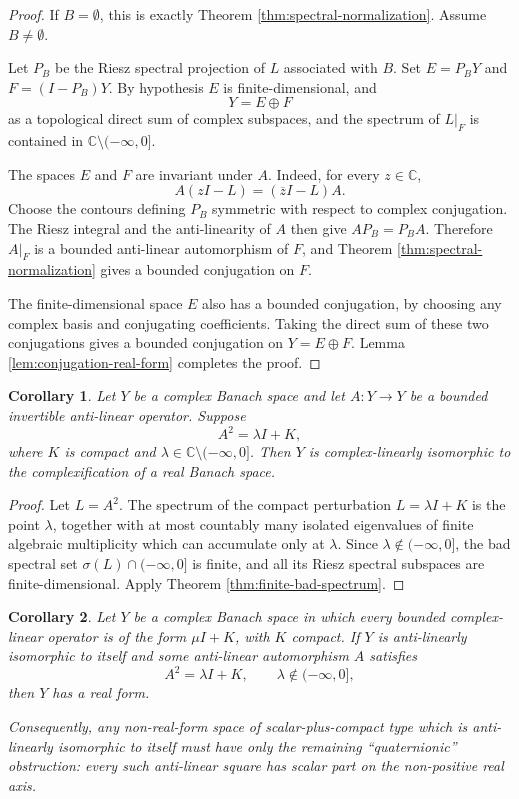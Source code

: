 \documentclass[11pt]{article}
\newtheorem{corollary}{Corollary}
\theoremstyle{remark}
\newcommand{\C}{\mathbb C}
\begin{document}
\begin{proof}
If \(B=\emptyset\), this is exactly Theorem
\ref{thm:spectral-normalization}.  Assume \(B\ne\emptyset\).

Let \(P_B\) be the Riesz spectral projection of \(L\) associated with \(B\).
Set \(E=P_BY\) and \(F=(I-P_B)Y\).  By hypothesis \(E\) is finite-dimensional,
and
\[
  Y=E\oplus F
\]
as a topological direct sum of complex subspaces, and the spectrum of \(L|_F\)
is contained in \(\C\setminus(-\infty,0]\).

The spaces \(E\) and \(F\) are invariant under \(A\).  Indeed, for every
\(z\in\C\),
\[
  A(zI-L)=(\overline z I-L)A .
\]
Choose the contours defining \(P_B\) symmetric with respect to complex
conjugation.  The Riesz integral and the anti-linearity of \(A\) then give
\(AP_B=P_BA\).  Therefore \(A|_F\) is a bounded anti-linear automorphism of
\(F\), and Theorem
\ref{thm:spectral-normalization} gives a bounded conjugation on \(F\).

The finite-dimensional space \(E\) also has a bounded conjugation, by choosing
any complex basis and conjugating coefficients.  Taking the direct sum of these
two conjugations gives a bounded conjugation on \(Y=E\oplus F\).  Lemma
\ref{lem:conjugation-real-form} completes the proof.
\end{proof}

\begin{corollary}\label{thm:compact-perturbation}
Let \(Y\) be a complex Banach space and let \(A:Y\to Y\) be a bounded
invertible anti-linear operator.  Suppose
\[
  A^2=\lambda I+K,
\]
where \(K\) is compact and \(\lambda\in\C\setminus(-\infty,0]\).  Then \(Y\)
is complex-linearly isomorphic to the complexification of a real Banach space.
\end{corollary}

\begin{proof}
Let \(L=A^2\).  The spectrum of the compact perturbation \(L=\lambda I+K\) is
the point \(\lambda\), together with at most countably many isolated eigenvalues
of finite algebraic multiplicity which can accumulate only at \(\lambda\).
Since \(\lambda\notin(-\infty,0]\), the bad spectral set
\(\sigma(L)\cap(-\infty,0]\) is finite, and all its Riesz spectral subspaces
are finite-dimensional.  Apply Theorem \ref{thm:finite-bad-spectrum}.
\end{proof}

\begin{corollary}\label{cor:scalar-compact-obstruction}
Let \(Y\) be a complex Banach space in which every bounded complex-linear
operator is of the form \(\mu I+K\), with \(K\) compact.  If \(Y\) is
anti-linearly isomorphic to itself and some anti-linear automorphism \(A\)
satisfies
\[
  A^2=\lambda I+K,\qquad \lambda\notin(-\infty,0],
\]
then \(Y\) has a real form.

Consequently, any non-real-form space of scalar-plus-compact type which is
anti-linearly isomorphic to itself must have only the remaining
``quaternionic'' obstruction: every such anti-linear square has scalar part on
the non-positive real axis.
\end{corollary}
\end{document}
